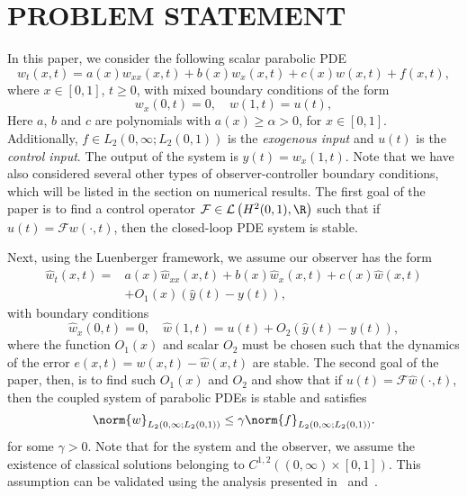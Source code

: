 \documentclass[US letter, 9 pt, conference]{ieeeconf}  \usepackage{setspace}
\newcommand{\wh}{\hat{w}}
\newcommand{\lt}{L_2(0,1)}
\newcommand{\mcl}[1]{\mathcal{#1}}
\begin{document}
\section{PROBLEM STATEMENT}\label{sec:pro_state}
In this paper, we consider the following scalar parabolic PDE
\begin{equation}\label{eqn:prob:PDE_form}
w_t(x,t)=a(x)w_{xx}(x,t)+b(x)w_x(x,t)+c(x)w(x,t)+f(x,t),
\end{equation}
where $x\in [0,1]$, $t \geq 0$, with mixed boundary conditions of the form
\begin{equation}\label{eqn:prob:PDE_form_BC}
w_x(0,t)=0, \quad w(1,t)=u(t),
\end{equation} Here $a$, $b$ and $c$ are polynomials with $a(x) \geq \alpha >0$, for $x \in [0,1]$. Additionally, $f \in L_2\left(0,\infty;\lt\right)$ is the \textit{exogenous input} and $u(t)$ is the \textit{control input}. The output of the system is $y(t)=w_x(1,t)$. Note that we have also considered several other types of observer-controller boundary conditions, which will be listed in the section on numerical results. The first goal of the paper is to find a control operator $\mcl{F}\in \mcl{L}\left(H^2(0,1), \R \right)$ such that if $u(t)=\mcl{F}w(\cdot,t)$, then the closed-loop PDE system is stable.

Next, using the Luenberger framework, we assume our observer has the form
\begin{align}
\wh_t(x,t)=&a(x)\wh_{xx}(x,t)+b(x)\wh_x(x,t)+c(x)\wh(x,t) \nonumber \\
&\label{eqn:prob:observer_form}+O_1(x)\left(\hat{y}(t)-y(t) \right),
\end{align} with boundary conditions
\begin{equation}\label{eqn:prob:observer_form_BC}
\hat{w}_x(0,t)=0, \quad \wh(1,t)=u(t)+O_2\left(\hat{y}(t)-y(t) \right),
\end{equation}
where the function $O_1(x)$ and scalar $O_2$ must be chosen such that the dynamics of the error $e(x,t)=w(x,t)-\wh(x,t)$ are stable. The second goal of the paper, then, is to find such $O_1(x)$ and $O_2$ and show that if $u(t)=\mcl{F}\wh(\cdot,t)$, then the coupled system of parabolic PDEs is stable and satisfies
\[\norm{w}_{L_2\left(0,\infty;\lt\right)}  \leq \gamma \norm{f}_{L_2\left(0,\infty;\lt\right)}.\]
for some $\gamma>0$. Note that for the system and the observer, we assume the existence of classical solutions belonging to $C^{1,2}\left((0,\infty) \times [0,1] \right)$. This assumption can be validated using the analysis presented in~\cite{balogh2004stability} and~\cite{fridman2009lmi}.
\end{document}
